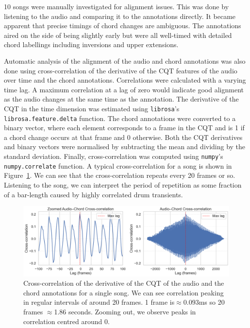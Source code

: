 10 songs were manually investigated for alignment issues. This was done by listening to the audio and comparing it to the annotations directly. It became apparent that precise timings of chord changes are ambiguous. The annotations aired on the side of being slightly early but were all well-timed with detailed chord labellings including inversions and upper extensions.

Automatic analysis of the alignment of the audio and chord annotations was also done using cross-correlation of the derivative of the CQT features of the audio over time and the chord annotations. Correlations were calculated with a varying time lag. A maximum correlation at a lag of zero would indicate good alignment as the audio changes at the same time as the annotation. The derivative of the CQT in the time dimension was estimated using \texttt{librosa}'s \texttt{librosa.feature.delta} function. The chord annotations were converted to a binary vector, where each element corresponds to a frame in the CQT and is 1 if a chord change occurs at that frame and 0 otherwise. Both the CQT derivatives and binary vectors were normalised by subtracting the mean and dividing by the standard deviation. Finally, cross-correlation was computed using \texttt{numpy}'s \texttt{numpy.correlate} function. A typical cross-correlation for a song is shown in Figure~\ref{fig:cross-correlation}. We can see that the cross-correlation repeats every 20 frames or so. Listening to the song, we can interpret the period of repetition as some fraction of a bar-length caused by highly correlated drum transients. 

\begin{figure}[H]
    \centering
    \includegraphics[width=1.0\textwidth]{figures/cross_correlation.png}
    \caption{Cross-correlation of the derivative of the CQT of the audio and the chord annotations for a single song. We can see correlation peaking in regular intervals of around 20 frames. 1 frame is$\approx 0.093$ms so 20 frames $\approx$1.86 seconds. Zooming out, we observe peaks in correlation centred around 0.}\label{fig:cross-correlation}
\end{figure}

